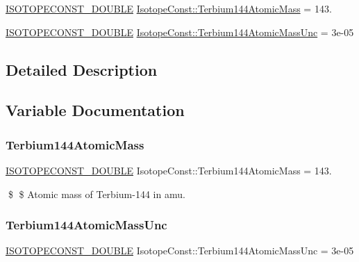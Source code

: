 \begin{DoxyCompactItemize}
\item 
\mbox{\hyperlink{group___isotope_const-_macros_ga8f45a7272ce02c0b4c65c44636ed719a}{I\+S\+O\+T\+O\+P\+E\+C\+O\+N\+S\+T\+\_\+\+D\+O\+U\+B\+LE}} \mbox{\hyperlink{group___isotope_const-_terbium-_tb144_gac3cc5dcbea8132318e0719eee57b037a}{Isotope\+Const\+::\+Terbium144\+Atomic\+Mass}} = 143.
\item 
\mbox{\hyperlink{group___isotope_const-_macros_ga8f45a7272ce02c0b4c65c44636ed719a}{I\+S\+O\+T\+O\+P\+E\+C\+O\+N\+S\+T\+\_\+\+D\+O\+U\+B\+LE}} \mbox{\hyperlink{group___isotope_const-_terbium-_tb144_ga1575833890a4e16ecf973b653be93d0f}{Isotope\+Const\+::\+Terbium144\+Atomic\+Mass\+Unc}} = 3e-\/05
\end{DoxyCompactItemize}


\subsection{Detailed Description}


\subsection{Variable Documentation}
\mbox{\label{group___isotope_const-_terbium-_tb144_gac3cc5dcbea8132318e0719eee57b037a}} 
\subsubsection{\texorpdfstring{Terbium144\+Atomic\+Mass}{Terbium144AtomicMass}}
{\footnotesize\ttfamily \mbox{\hyperlink{group___isotope_const-_macros_ga8f45a7272ce02c0b4c65c44636ed719a}{I\+S\+O\+T\+O\+P\+E\+C\+O\+N\+S\+T\+\_\+\+D\+O\+U\+B\+LE}} Isotope\+Const\+::\+Terbium144\+Atomic\+Mass = 143.}

\$ \$ Atomic mass of Terbium-\/144 in amu. \mbox{\label{group___isotope_const-_terbium-_tb144_ga1575833890a4e16ecf973b653be93d0f}} 
\subsubsection{\texorpdfstring{Terbium144\+Atomic\+Mass\+Unc}{Terbium144AtomicMassUnc}}
{\footnotesize\ttfamily \mbox{\hyperlink{group___isotope_const-_macros_ga8f45a7272ce02c0b4c65c44636ed719a}{I\+S\+O\+T\+O\+P\+E\+C\+O\+N\+S\+T\+\_\+\+D\+O\+U\+B\+LE}} Isotope\+Const\+::\+Terbium144\+Atomic\+Mass\+Unc = 3e-\/05}

